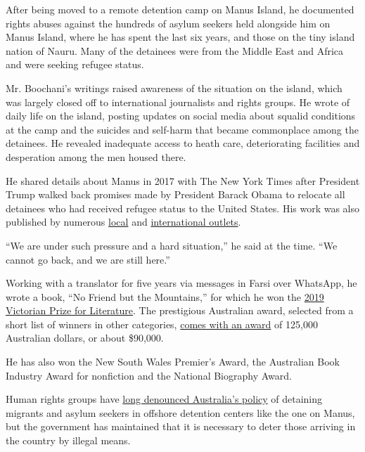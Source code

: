 After being moved to a remote detention camp on Manus Island, he
documented rights abuses against the hundreds of asylum seekers held
alongside him on Manus Island, where he has spent the last six years,
and those on the tiny island nation of Nauru. Many of the detainees were
from the Middle East and Africa and were seeking refugee status.

Mr. Boochani's writings raised awareness of the situation on the island,
which was largely closed off to international journalists and rights
groups. He wrote of daily life on the island, posting updates on social
media about squalid conditions at the camp and the suicides and
self-harm that became commonplace among the detainees. He revealed
inadequate access to heath care, deteriorating facilities and
desperation among the men housed there.

He shared details about Manus in 2017 with The New York Times after
President Trump walked back promises made by President Barack Obama to
relocate all detainees who had received refugee status to the United
States. His work was also published by numerous
\href{https://www.thesaturdaypaper.com.au/contributor/behrouz-boochani}{local}
and
\href{https://www.theguardian.com/profile/behrouz-boochani}{international
outlets}.

``We are under such pressure and a hard situation,'' he said at the
time. ``We cannot go back, and we are still here.''

Working with a translator for five years via messages in Farsi over
WhatsApp, he wrote a book, ``No Friend but the Mountains,'' for which he
won the
\href{https://www.wheelercentre.com/news/behrouz-boochani-wins-the-2019-victorian-prize-for-literature}{2019
Victorian Prize for Literature}. The prestigious Australian award,
selected from a short list of winners in other categories,
\href{https://www.nytimes3xbfgragh.onion/2019/01/31/world/australia/behrouz-boochani-victorian-prize-manus-island.html}{comes
with an award} of 125,000 Australian dollars, or about \$90,000.

He has also won the New South Wales Premier's Award, the Australian Book
Industry Award for nonfiction and the National Biography Award.

Human rights groups have
\href{https://www.nytimes3xbfgragh.onion/2019/06/26/world/australia/australia-manus-suicide.html}{long
denounced Australia's policy} of detaining migrants and asylum seekers
in offshore detention centers like the one on Manus, but the government
has maintained that it is necessary to deter those arriving in the
country by illegal means.

